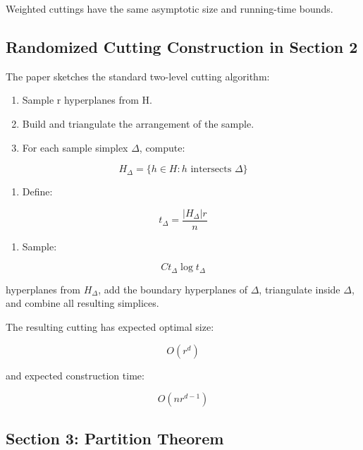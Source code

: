 \documentclass[
  11pt,
]{article}
\providecommand{\tightlist}{%
  \setlength{\itemsep}{0pt}\setlength{\parskip}{0pt}}
\begin{document}
Weighted cuttings have the same asymptotic size and running-time bounds.

\hypertarget{randomized-cutting-construction-in-section-2}{%
\subsection{Randomized Cutting Construction in Section
2}\label{randomized-cutting-construction-in-section-2}}

The paper sketches the standard two-level cutting algorithm:

\begin{enumerate}
\def\labelenumi{\arabic{enumi}.}
\tightlist
\item
  Sample r hyperplanes from H.
\item
  Build and triangulate the arrangement of the sample.
\item
  For each sample simplex \(\Delta\), compute:
\end{enumerate}

\[
H_\Delta=\lbrace h\in H:h\text{ intersects }\Delta \rbrace
\]

\begin{enumerate}
\def\labelenumi{\arabic{enumi}.}
\setcounter{enumi}{3}
\tightlist
\item
  Define:
\end{enumerate}

\[
t_\Delta=\frac{|H_\Delta|r}{n}
\]

\begin{enumerate}
\def\labelenumi{\arabic{enumi}.}
\setcounter{enumi}{4}
\tightlist
\item
  Sample:
\end{enumerate}

\[
C t_\Delta \log t_\Delta
\]

hyperplanes from \(H_\Delta\), add the boundary hyperplanes of
\(\Delta\), triangulate inside \(\Delta\), and combine all resulting
simplices.

The resulting cutting has expected optimal size:

\[
O(r^d)
\]

and expected construction time:

\[
O(nr^{d-1})
\]

\hypertarget{section-3-partition-theorem}{%
\subsection{Section 3: Partition
Theorem}\label{section-3-partition-theorem}}
\end{document}
